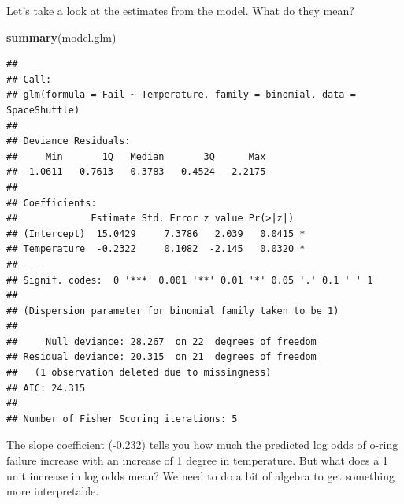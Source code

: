 \documentclass[
]{book}
\newenvironment{Shaded}{\begin{snugshade}}{\end{snugshade}}
\newcommand{\KeywordTok}[1]{\textcolor[rgb]{0.13,0.29,0.53}{\textbf{#1}}}
\newcommand{\NormalTok}[1]{#1}
\begin{document}
Let's take a look at the estimates from the model. What do they mean?

\begin{Shaded}
\begin{Highlighting}[]
\KeywordTok{summary}\NormalTok{(model.glm)}
\end{Highlighting}
\end{Shaded}

\begin{verbatim}
## 
## Call:
## glm(formula = Fail ~ Temperature, family = binomial, data = SpaceShuttle)
## 
## Deviance Residuals: 
##     Min       1Q   Median       3Q      Max  
## -1.0611  -0.7613  -0.3783   0.4524   2.2175  
## 
## Coefficients:
##             Estimate Std. Error z value Pr(>|z|)  
## (Intercept)  15.0429     7.3786   2.039   0.0415 *
## Temperature  -0.2322     0.1082  -2.145   0.0320 *
## ---
## Signif. codes:  0 '***' 0.001 '**' 0.01 '*' 0.05 '.' 0.1 ' ' 1
## 
## (Dispersion parameter for binomial family taken to be 1)
## 
##     Null deviance: 28.267  on 22  degrees of freedom
## Residual deviance: 20.315  on 21  degrees of freedom
##   (1 observation deleted due to missingness)
## AIC: 24.315
## 
## Number of Fisher Scoring iterations: 5
\end{verbatim}

The slope coefficient (-0.232) tells you how much the predicted log odds of o-ring failure increase with an increase of 1 degree in temperature. But what does a 1 unit increase in log odds mean? We need to do a bit of algebra to get something more interpretable.
\end{document}
